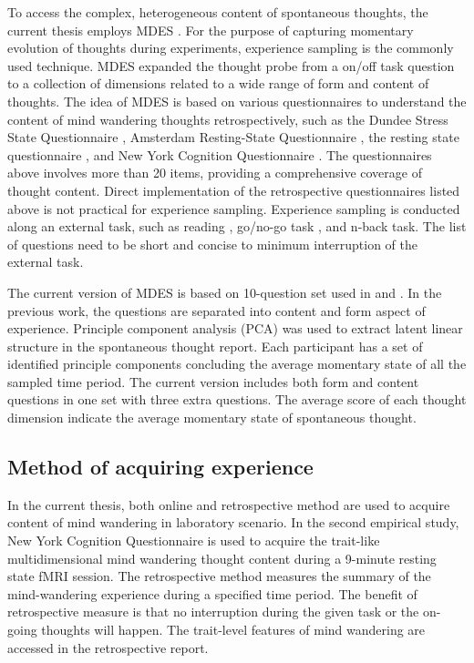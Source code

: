 To access the complex, heterogeneous content of spontaneous thoughts, the current thesis employs MDES \cite{Medea2016, RubyPlos2013, Smallwood2016}. For the purpose of capturing momentary evolution of thoughts during experiments, experience sampling \cite{Kahneman2004} is the commonly used technique. MDES expanded the thought probe from a on/off task question to a collection of dimensions related to a wide range of form and content of thoughts. The idea of MDES is based on various questionnaires to understand the content of mind wandering thoughts retrospectively, such as the Dundee Stress State Questionnaire \cite{Matthews1999}, Amsterdam Resting-State Questionnaire \cite{Diaz2013}, the resting state questionnaire \cite{Delamillieure2010}, and New York Cognition Questionnaire \cite{Gorgolewski2014}. The questionnaires above involves more than 20 items, providing a comprehensive coverage of thought content. Direct implementation of the retrospective questionnaires listed above is not practical for experience sampling. Experience sampling is conducted along an external task, such as reading \cite{Franklin2011}, go/no-go task \cite{Christoff2009}, and n-back task\cite{Kane2007}. The list of questions need to be short and concise to minimum interruption of the external task.

The current version of MDES is based on 10-question set used in \cite{Medea2016} and . In the previous work, the questions are separated into content and form aspect of experience. Principle component analysis (PCA) was used to extract latent linear structure in the spontaneous thought report. Each participant has a set of identified principle components concluding the average momentary state of all the sampled time period. The current version includes both form and content questions in one set with three extra questions. The average score of each thought dimension indicate the average momentary state of spontaneous thought.

\subsection{Method of acquiring experience}

In the current thesis, both online and retrospective method are used to acquire content of mind wandering in laboratory scenario. In the second empirical study, New York Cognition Questionnaire \cite{Gorgolewski2014} is used to acquire the trait-like multidimensional mind wandering thought content during a 9-minute resting state fMRI session. The retrospective method measures the summary of the mind-wandering experience during a specified time period. The benefit of retrospective measure is that no interruption during the given task or the on-going thoughts will happen. The trait-level features of mind wandering are accessed in the retrospective report. 

